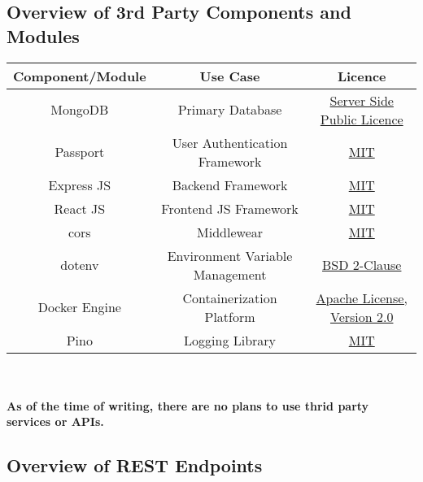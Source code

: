 \subsection{Overview of 3rd Party Components and Modules}

\begin{tabular}{|c|c|c|}
    \hline
    \textbf{Component/Module}& \textbf{Use Case}&\textbf{Licence}\\%

    \hline
    MongoDB & Primary Database & \href{https://www.mongodb.com/legal/licensing/server-side-public-license}{Server Side Public Licence}\\ 
    \hline
    Passport & User Authentication Framework & \href{https://github.com/jaredhanson/passport/blob/master/LICENSE}{MIT}\\ 
    \hline
    Express JS & Backend Framework & \href{https://github.com/expressjs/express/blob/master/LICENSE}{MIT}\\ 
    \hline
    React JS & Frontend JS Framework & \href{https://github.com/facebook/react/blob/main/LICENSE}{MIT}\\
    \hline
    cors & Middlewear & \href{https://www.npmjs.com/package/cors}{MIT}\\
    \hline
    dotenv & Environment Variable Management & \href{https://github.com/motdotla/dotenv/blob/master/LICENSE}{BSD 2-Clause}\\
    \hline
    Docker Engine & Containerization Platform & \href{https://github.com/moby/moby/blob/master/LICENSE}{Apache License, Version 2.0}\\ 
    \hline
    Pino & Logging Library & \href{https://github.com/pinojs/pino/blob/main/LICENSE}{MIT}\\
    \hline
\end{tabular}\\\\
\textbf{As of the time of writing, there are no plans to use thrid party services or APIs.}

\subsection{Overview of REST Endpoints}

